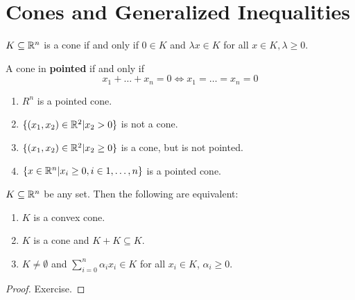 \chapter{Cones and Generalized Inequalities}
\label{cha:cones-gener-ineq}

\begin{defn}
  \label{defn:cones_and_generalized_inequalities:1}
  $K \subseteq \mathbb{R}^{n}$ is a cone if and only if $0 \in K$ and $\lambda x
  \in K$ for all $x \in K, \lambda \geq 0$.
\end{defn}

\begin{defn}
  \label{defn:cones_and_generalized_inequalities:1}
  A cone in \textbf{pointed} if and only if
  \begin{equation}
    \label{eq:27}
     x_{1} + \dots + x_{n} = 0 \iff x_{1} = \dots = x_{n} = 0
  \end{equation}
\end{defn}

\begin{exmp}
  \label{defn:cones_and_generalized_inequalities:1}
  \begin{enumerate}
  \item $R^{n}$ is a pointed cone.
  \item $\{ (x_{1}, x_{2}) \in \mathbb{R}^{2} | x_{2} > 0 \}$ is not a cone.
  \item $\{ (x_{1}, x_{2}) \in \mathbb{R}^{2} | x_{2} \geq 0 \}$ is a cone,
    but is not pointed.
  \item $\{ x \in \mathbb{R}^{n} | x_{i} \geq 0, i \in 1, \dots, n \}$ is a
    pointed cone.
  \end{enumerate}
\end{exmp}

\begin{proposition}
  $K \subseteq \mathbb{R}^{n}$ be any set.  Then the following are equivalent:
  \begin{enumerate}
  \item $K$ is a convex cone.
  \item $K$ is a cone and $K + K \subseteq K$.
  \item $K \neq \emptyset$ and $\sum_{i=0}^{n} \alpha_{i} x_{i} \in K$
    for all $x_{i} \in K$, $\alpha_{i} \geq 0$.
  \end{enumerate}
\end{proposition}

\begin{proof}
  Exercise.
\end{proof}

